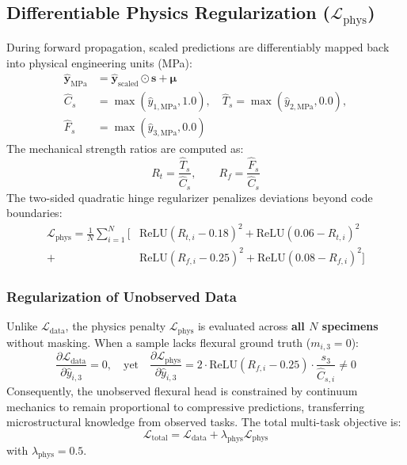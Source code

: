 \documentclass[conference]{IEEEtran}
\begin{document}
\subsection{Differentiable Physics Regularization ($\mathcal{L}_{\text{phys}}$)}
During forward propagation, scaled predictions are differentiably mapped back into physical engineering units (MPa):
\begin{equation}
\begin{aligned}
    \hat{\mathbf{y}}_{\text{MPa}} &= \hat{\mathbf{y}}_{\text{scaled}} \odot \mathbf{s} + \boldsymbol{\mu} \\[6pt]
    \hat{C}_s &= \max(\hat{y}_{1,\text{MPa}}, 1.0), \quad 
    \hat{T}_s = \max(\hat{y}_{2,\text{MPa}}, 0.0), \\
    \hat{F}_s &= \max(\hat{y}_{3,\text{MPa}}, 0.0)
\end{aligned}
\end{equation}
The mechanical strength ratios are computed as:
\begin{equation}
    R_t = \frac{\hat{T}_s}{\hat{C}_s}, \qquad R_f = \frac{\hat{F}_s}{\hat{C}_s}
\end{equation}
The two-sided quadratic hinge regularizer penalizes deviations beyond code boundaries:
\begin{align}
    \mathcal{L}_{\text{phys}} = \frac{1}{N} \sum_{i=1}^N \Big[ & \text{ReLU}(R_{t,i} - 0.18)^2 + \text{ReLU}(0.06 - R_{t,i})^2 \nonumber \\
    + & \text{ReLU}(R_{f,i} - 0.25)^2 + \text{ReLU}(0.08 - R_{f,i})^2 \Big]
\end{align}

\subsubsection{Regularization of Unobserved Data}
Unlike $\mathcal{L}_{\text{data}}$, the physics penalty $\mathcal{L}_{\text{phys}}$ is evaluated across \textbf{all $N$ specimens} without masking. When a sample lacks flexural ground truth ($m_{i,3} = 0$):
\begin{equation}
    \frac{\partial \mathcal{L}_{\text{data}}}{\partial \hat{y}_{i,3}} = 0, \quad \text{yet} \quad \frac{\partial \mathcal{L}_{\text{phys}}}{\partial \hat{y}_{i,3}} = 2 \cdot \text{ReLU}(R_{f,i} - 0.25) \cdot \frac{s_3}{\hat{C}_{s,i}} \neq 0
\end{equation}
Consequently, the unobserved flexural head is constrained by continuum mechanics to remain proportional to compressive predictions, transferring microstructural knowledge from observed tasks. The total multi-task objective is:
\begin{equation}
    \mathcal{L}_{\text{total}} = \mathcal{L}_{\text{data}} + \lambda_{\text{phys}} \mathcal{L}_{\text{phys}}
\end{equation}
with $\lambda_{\text{phys}} = 0.5$.
\end{document}
